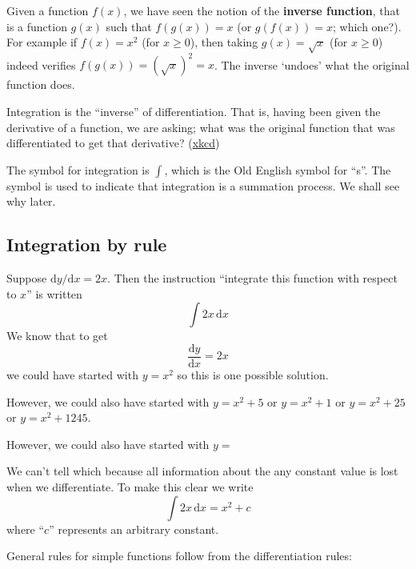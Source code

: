 \documentclass[
  11pt,
  oneside]{book}
\newcommand{\slide}{}
\theoremstyle{definition}
\theoremstyle{definition}
\theoremstyle{definition}
\theoremstyle{definition}
\theoremstyle{remark}
\begin{document}
Given a function \(f(x)\), we have seen the notion of the \textbf{inverse function}, that is a function \(g(x)\) such that \(f(g(x)) = x\) (or \(g(f(x))=x\); which one?). For example if \(f(x) = x^2\) (for \(x\geq0\)), then taking \(g(x) = \sqrt{x}\) (for \(x\geq0\)) indeed verifies \(f(g(x)) = (\sqrt{x})^2 = x\). The inverse `undoes' what the original function does.

Integration is the ``inverse'' of differentiation. That is, having been given the derivative of a function, we are asking; what was the original function that was differentiated to get that derivative? (\href{https://xkcd.com/2117/}{xkcd})

The symbol for integration is \(\displaystyle\int\), which is the Old English symbol for ``s''. The symbol is used to indicate that integration is a summation process. We shall see why later.

\slide

\subsection{Integration by rule}\label{integration-by-rule}

Suppose \(\mathrm{d}y/\mathrm{d} x = 2x\). Then the instruction ``integrate this function with respect to \(x\)'' is written
\[
\int 2x \,\mathrm{d}x
\]
We know that to get
\[
\frac{\mathrm{d}y}{\mathrm{d}x} = 2x
\]
we could have started with \(y = x^2\) so this is one possible solution.

\begin{notslides}

However, we could also have started with \(y = x^2 + 5\) or \(y = x^2 + 1\) or \(y = x^2 + 25\) or \(y = x^2 + 1245\).

\end{notslides}

\begin{slidesonly}

However, we could also have started with \(y =\)
\slide

\end{slidesonly}

We can't tell which because all information about the any constant value is lost when we differentiate. To make this clear we write
\[
\int 2x \,\mathrm{d}x = x^2 + c
\]
where ``\(c\)'' represents an arbitrary constant.

\slide

General rules for simple functions follow from the differentiation rules:
\end{document}

